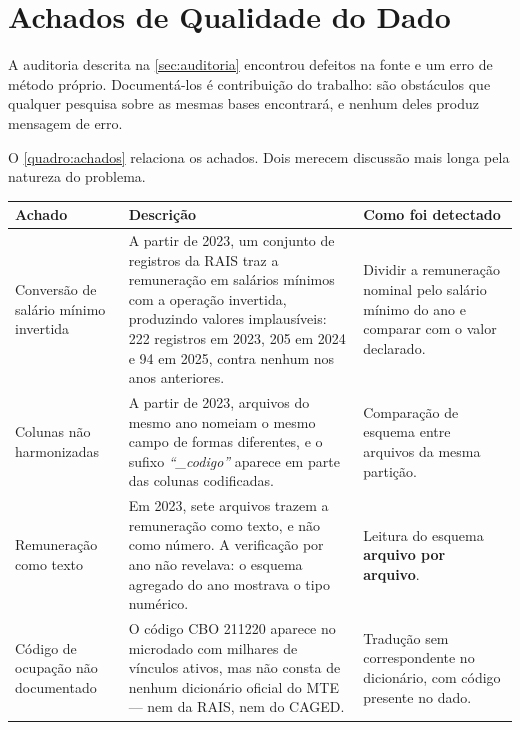 \section{Achados de Qualidade do Dado}
\label{sec:achados-qualidade}

A auditoria descrita na \autoref{sec:auditoria} encontrou defeitos na fonte e um erro de método próprio. Documentá-los é contribuição do trabalho: são obstáculos que qualquer pesquisa sobre as mesmas bases encontrará, e nenhum deles produz mensagem de erro.

O \autoref{quadro:achados} relaciona os achados. Dois merecem discussão mais longa pela natureza do problema.

\begin{quadro}[htbp]
    \centering
    \caption{Defeitos de dado e de método encontrados durante a construção}
    \label{quadro:achados}
    \footnotesize
    \renewcommand{\arraystretch}{1.3}
    \begin{tabularx}{\textwidth}{%
        >{\raggedright\arraybackslash\hsize=0.70\hsize}X
        >{\raggedright\arraybackslash\hsize=1.35\hsize}X
        >{\raggedright\arraybackslash\hsize=0.95\hsize}X}
        \toprule
        \rowcolor{black!8}
        \textbf{Achado} & \textbf{Descrição} & \textbf{Como foi detectado} \\
        \midrule
        Conversão de salário mínimo invertida & A partir de 2023, um conjunto de registros da RAIS traz a remuneração em salários mínimos com a operação invertida, produzindo valores implausíveis: 222 registros em 2023, 205 em 2024 e 94 em 2025, contra nenhum nos anos anteriores. & Dividir a remuneração nominal pelo salário mínimo do ano e comparar com o valor declarado. \\
        Colunas não harmonizadas & A partir de 2023, arquivos do mesmo ano nomeiam o mesmo campo de formas diferentes, e o sufixo \textit{``\_codigo''} aparece em parte das colunas codificadas. & Comparação de esquema entre arquivos da mesma partição. \\
        Remuneração como texto & Em 2023, sete arquivos trazem a remuneração como texto, e não como número. A verificação por ano não revelava: o esquema agregado do ano mostrava o tipo numérico. & Leitura do esquema \textbf{arquivo por arquivo}. \\
        Código de ocupação não documentado & O código CBO 211220 aparece no microdado com milhares de vínculos ativos, mas não consta de nenhum dicionário oficial do MTE --- nem da RAIS, nem do CAGED. & Tradução sem correspondente no dicionário, com código presente no dado. \\

\end{tabularx}
\end{quadro}
